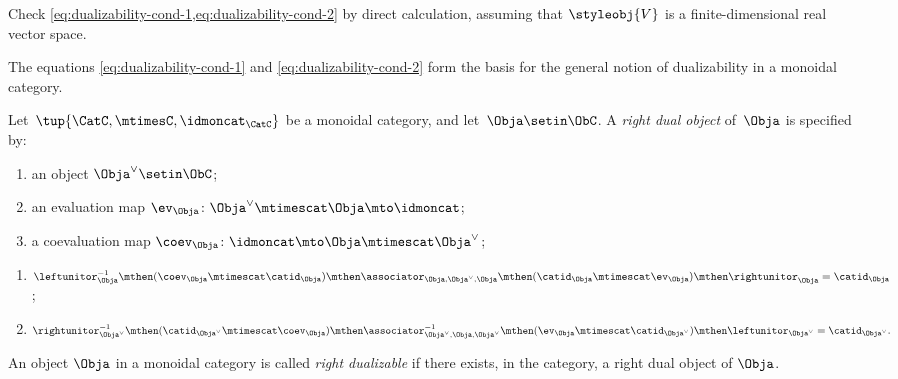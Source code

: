 \begin{gradedexercise}
    \label{ex:VectSnakeEquations}
    Check \cref{eq:dualizability-cond-1,eq:dualizability-cond-2} by direct calculation, assuming that $\styleobj{V}$ is a finite-dimensional real vector space.
\end{gradedexercise}


The equations \cref{eq:dualizability-cond-1} and \cref{eq:dualizability-cond-2} form the basis for the general notion of dualizability in a monoidal category.

\begin{ctdefinition}
    \label{def:dualizable-object}
    Let~$\tup{\CatC,\mtimesC,\idmoncat_{\CatC}}$ be a monoidal category, and let~$\Obja \setin \ObC$.
    A \emph{right dual object} of~$\Obja$ is specified by:

    \constit
    \begin{enumerate}
        \item an object $\Obja^\vee \setin \ObC$;
        \item an evaluation map $\ev_\Obja\colon \Obja^\vee \mtimescat \Obja \mto \idmoncat$;
        \item a coevaluation map $\coev_\Obja\colon \idmoncat \mto \Obja \mtimescat \Obja^\vee$;
    \end{enumerate}

    \condit
    \begin{enumerate}
        \item $\leftunitor_{\Obja}^{-1} \mthen (\coev_\Obja \mtimescat \catid_\Obja) \mthen  \associator_{\Obja, \Obja^\vee, \Obja} \mthen(\catid_\Obja \mtimescat \ev_\Obja) \mthen \rightunitor_{\Obja} = \catid_\Obja$;
        \item $\rightunitor_{\Obja^\vee}^{-1} \mthen (\catid_{\Obja^\vee} \mtimescat \coev_\Obja)  \mthen \associator_{\Obja^\vee, \Obja, \Obja^\vee}^{-1} \mthen (\ev_\Obja \mtimescat \catid_{\Obja^\vee}) \mthen \leftunitor_{\Obja^\vee}  = \catid_{\Obja^\vee}.
              $

    \end{enumerate}
\end{ctdefinition}

\begin{definition}
    An object $\Obja$ in a monoidal category is called \emph{right dualizable} if there exists, in the category, a right dual object of $\Obja$.
\end{definition}

